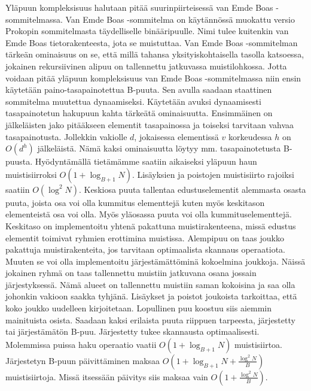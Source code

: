 \documentclass[finnish]{tktltiki2}
\theoremstyle{definition}
\theoremstyle{remark}
\begin{document}
\newline \indent Yläpuun kompleksisuus halutaan pitää suurinpiirteisessä van Emde
Boas -sommitelmassa. Van Emde Boas -sommitelma on käytännössä muokattu versio
Prokopin sommitelmasta täydelliselle binääripuulle. Nimi tulee kuitenkin van
Emde Boas tietorakenteesta, jota se muistuttaa. Van Emde Boas -sommitelman
tärkeän ominaisuus on se, että millä tahansa yksityiskohtaisella tasolla
katsoessa, jokainen rekursiivinen alipuu on tallennettu jatkuvassa
muistilohkossa. Jotta voidaan pitää yläpuun kompleksisuus van Emde Boas
-sommitelmassa niin ensin käytetään paino-tasapainotettua B-puuta. Sen avulla
saadaan staattinen sommitelma muutettua dynaamiseksi. Käytetään avuksi dynaamisesti
tasapainotetun hakupuun kahta tärkeätä ominaisuutta. Ensimmäinen on
jälkeläisten jako pitääkseen elementit tasapainossa ja toiseksi tarvitaan
vahvaa tasapainotusta. Jollekkin vakiolle \(d\), jokaisessa elementissä \(v\)
korkeudessa \(h\) on \(O(d^h)\) jälkeläistä. Nämä kaksi ominaisuutta
löytyy mm. tasapainotetusta B-puusta. Hyödyntämällä tietämämme saatiin aikaiseksi
yläpuun haun muistisiirroksi \(O(1+\log_{B+1}N)\). Lisäyksien ja poistojen muistisiirto rajoiksi
saatiin \(O(\log^2N)\).
\newline \indent Keskiosa puuta tallentaa edustuselementit alemmasta osasta puuta, joista osa
voi olla kummitus elementtejä kuten myös keskitason elementeistä osa voi olla.
Myös yläosassa puuta voi olla kummituselementtejä. Keskitaso on implementoitu
yhtenä pakattuna muistirakenteena, missä edustus elementit toimivat ryhmien
erottimina muistissa. Alempipuu on taas joukko pakattuja muistirakenteita, jos
tarvitaan optimaalista skannaus operaatiota. Muuten se voi olla implementoitu
järjestämättöminä kokoelmina joukkoja. Näissä jokainen ryhmä on taas
tallennettu muistiin jatkuvana osana jossain järjestyksessä. Nämä alueet on
tallennettu muistiin saman kokoisina ja saa olla johonkin vakioon saakka tyhjänä.
Lisäykset ja poistot joukoista tarkoittaa, että koko joukko uudelleen
kirjoitetaan.
\newline \indent Lopullinen puu koostuu siis aiemmin mainituista osista. Saadaan
kaksi erilaista puuta riippuen tarpeesta, järjestetty tai järjestämätön B-puu.
Järjestetty tukee skannausta optimaalisesti. Molemmissa puissa haku operaatio vaatii
\(O(1+\log_{B+1}N)\) muistisiirtoa. Järjestetyn B-puun päivittäminen maksaa
\(O(1+\log_{B+1}N+\tfrac{\log^2 N}{B})\) muistisiirtoja. Missä itsessään päivitys
siis maksaa vain \(O(1+\tfrac{\log^2 N}{B})\).



%
%
% 
%

% 
% 
\end{document}
